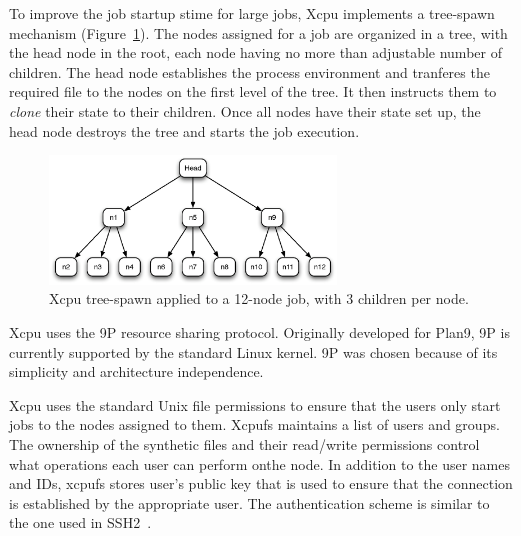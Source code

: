 \documentclass[10pt,conference,letterpaper]{IEEEtran}
\begin{document}
To improve the job startup stime for large jobs, Xcpu implements a
tree-spawn mechanism (Figure~\ref{fig:xcpu-tspawn}). The nodes assigned for
a job are organized in a tree, with the head node in the root, each node
having no more than adjustable number of children. The head node establishes
the process environment and tranferes the required file to the nodes on the
first level of the tree. It then instructs them to \textsl{clone} their
state to their children. Once all nodes have their state set up, the head
node destroys the tree and starts the job execution.

\begin{figure}[h]
\begin{center}
\includegraphics[width=3in, keepaspectratio]{xcpu-tspawn.eps}
\end{center}
\caption{Xcpu tree-spawn applied to a 12-node job, with 3 children per node.}
\label{fig:xcpu-tspawn}
\end{figure}

Xcpu uses the 9P resource sharing protocol. Originally developed for Plan9,
9P is currently supported by the standard Linux kernel. 9P was chosen
because of its simplicity and architecture independence.

Xcpu uses the standard Unix file permissions to ensure that the users only
start jobs to the nodes assigned to them. Xcpufs maintains a list of users
and groups. The ownership of the synthetic files and their read/write
permissions control what operations each user can perform onthe node. In
addition to the user names and IDs, xcpufs stores user's public key that is
used to ensure that the connection is established by the appropriate user.
The authentication scheme is similar to the one used in SSH2~\cite{rfc4252}.
\end{document}
